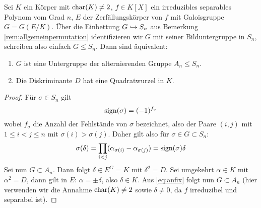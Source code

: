 \documentclass{book}
\begin{document}
\begin{thm}
    \label{thm:diskan}
    Sei $K$ ein Körper mit $\operatorname{char}(K) \ne 2$, $f \in K[X]$ ein irreduzibles separables Polynom vom
    Grad $n$, $E$ der Zerfällungskörper von $f$ mit Galoisgruppe $G = G(E/K)$.
    Über die Einbettung $G \hookrightarrow S_n$ aus Bemerkung
    \ref{rem:allgemeinpermutation} identifizieren wir $G$ mit seiner
    Bilduntergruppe in $S_n$, schreiben also einfach $G \le S_n$. Dann sind äquivalent:
    \begin{enumerate}[label=(\roman *)]
        \item $G$ ist eine Untergruppe der alternierenden Gruppe $A_n \le S_n$.
        \item Die Diskriminante $D$ hat eine Quadratwurzel in $K$. 
    \end{enumerate}
\end{thm}
\begin{proof}
    Für $\sigma \in S_n$ gilt
    \[
        \operatorname{sign}(\sigma) = (-1)^{f_\sigma}
    \]
    wobei $f_\sigma$ die Anzahl der Fehlstände von $\sigma$ bezeichnet, also
    der Paare $(i,j)$ mit $1 \le i < j \le n$ mit $\sigma(i) > \sigma(j)$.
    Daher gilt also für $\sigma \in G \subset S_n$:
    \begin{equation}\label{eq:anfix}
            \sigma(\delta) = \prod_{i < j} (\alpha_{\sigma(i)} - \alpha_{\sigma(j)}) = \operatorname{sign}(\sigma) \delta
    \end{equation}
    Sei nun $G \subset A_n$. Dann folgt $\delta \in E^G  = K$ mit $\delta^2 =
    D$. Sei umgekehrt $\alpha \in K$ mit $\alpha^2 = D$, dann gilt in $E$: $\alpha =
    \pm \delta$, also $\delta \in K$. Aus \eqref{eq:anfix} folgt nun $G \subset
    A_n$ (hier verwenden wir die Annahme $\operatorname{char}(K) \ne 2$ sowie $\delta \ne
    0$, da $f$ irreduzibel und separabel ist). 
\end{proof}
\end{document}
